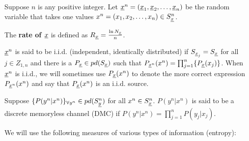 Suppose
$n$ is any positive integer.
Let ${\underline{x}}^n = ({\underline{x}}_1, {\underline{x}}_2, \ldots, {\underline{x}}_n)$
be the random variable that takes one values
$x^n = (x_1, x_2, \ldots, x_n)\in S_{\underline{x}}^n$.

The {\bf rate of ${\underline{x}}$} is defined as
$R_{\underline{x}} = \frac{\ln N_{\underline{x}}}{n}$.


${\underline{x}}^n$ is said to be i.i.d.
(independent, identically
distributed)
if $S_{{\underline{x}}_j}=S_{\underline{x}}$ for all $j\in Z_{1,n}$
and there is a $P_{\underline{x}}\in pd(S_{\underline{x}})$
such that
$P_{{\underline{x}}^n}(x^n)=
\prod_{j=1}^n\{
P_{\underline{x}}(x_j)\}$.
When ${\underline{x}}^n$ is i.i.d.,
we will sometimes use
$P_{{\underline{x}}}(x^n)$ to denote
the more correct expression
$P_{{\underline{x}}^n}(x^n)$
and say that
$P_{\underline{x}}(x^n)$
is an i.i.d. source.

Suppose $\{P(y^n|x^n)\}_{\forall y^n}\in pd(S^n_{\underline{y}})$
for all $x^n\in S_{\underline{x}}^n$.
$P(y^n|x^n)$
is said to be a discrete memoryless channel (DMC)
if
$P(y^n|x^n) =\prod_{j=1}^{n}P(y_j|x_j)$.

We will use the following
measures of various
types of information (entropy):

